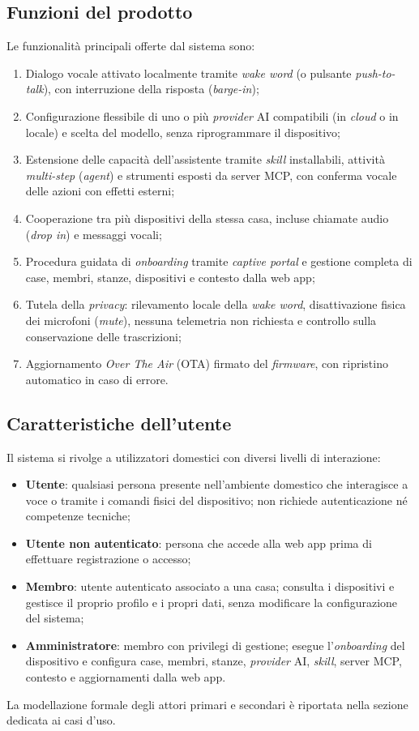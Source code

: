 \documentclass[12pt,a4paper]{article}
\newcommand{\tightlist}{\setlength{\itemsep}{1pt}\setlength{\parskip}{0pt}}
\begin{document}
\subsection{Funzioni del prodotto}
Le funzionalità principali offerte dal sistema sono:
\begin{enumerate}
\tightlist
\item Dialogo vocale attivato localmente tramite \emph{wake word} (o pulsante \emph{push-to-talk}), con interruzione della risposta (\emph{barge-in});
\item Configurazione flessibile di uno o più \emph{provider} AI compatibili (in \emph{cloud} o in locale) e scelta del modello, senza riprogrammare il dispositivo;
\item Estensione delle capacità dell'assistente tramite \emph{skill} installabili, attività \emph{multi-step} (\emph{agent}) e strumenti esposti da server MCP, con conferma vocale delle azioni con effetti esterni;
\item Cooperazione tra più dispositivi della stessa casa, incluse chiamate audio (\emph{drop in}) e messaggi vocali;
\item Procedura guidata di \emph{onboarding} tramite \emph{captive portal} e gestione completa di case, membri, stanze, dispositivi e contesto dalla web app;
\item Tutela della \emph{privacy}: rilevamento locale della \emph{wake word}, disattivazione fisica dei microfoni (\emph{mute}), nessuna telemetria non richiesta e controllo sulla conservazione delle trascrizioni;
\item Aggiornamento \emph{Over The Air} (OTA) firmato del \emph{firmware}, con ripristino automatico in caso di errore.
\end{enumerate}
 
\subsection{Caratteristiche dell'utente}
Il sistema si rivolge a utilizzatori domestici con diversi livelli di interazione:
\begin{itemize}
\tightlist
\item \textbf{Utente}: qualsiasi persona presente nell'ambiente domestico che interagisce a voce o tramite i comandi fisici del dispositivo; non richiede autenticazione né competenze tecniche;
\item \textbf{Utente non autenticato}: persona che accede alla web app prima di effettuare registrazione o accesso;
\item \textbf{Membro}: utente autenticato associato a una casa; consulta i dispositivi e gestisce il proprio profilo e i propri dati, senza modificare la configurazione del sistema;
\item \textbf{Amministratore}: membro con privilegi di gestione; esegue l'\emph{onboarding} del dispositivo e configura case, membri, stanze, \emph{provider} AI, \emph{skill}, server MCP, contesto e aggiornamenti dalla web app.
\end{itemize}
La modellazione formale degli attori primari e secondari è riportata nella sezione dedicata ai casi d'uso.
 
\end{document}
